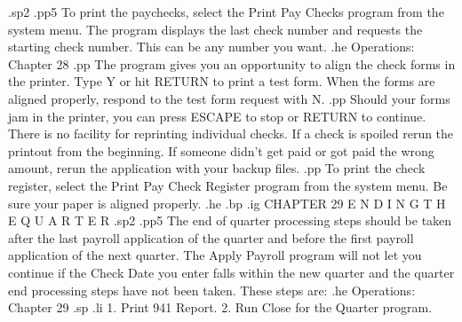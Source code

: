 .sp2
.pp5
To print the paychecks, select the Print Pay Checks program from the
system menu. The program displays the last check number and
requests the starting check number.  This can be any number you want.
.he Operations: Chapter 28
.pp
The program gives you an opportunity to align the check forms in
the printer.  Type Y or hit RETURN to print a test form.  When the
forms are aligned properly, respond to the test form request with N.
.pp
Should your forms jam in the printer, you can press ESCAPE to stop
or RETURN to continue.	There is no facility for reprinting individual
checks.  If a check is spoiled rerun the printout from the
beginning.  If someone didn't get paid or got paid the wrong amount,
rerun the application with your backup files.
.pp
To print the check register, select the Print Pay Check Register program
from the system menu.	Be sure your paper is aligned properly.
.he
.bp
.ig
CHAPTER 29
E N D I N G    T H E	Q U A R T E R
.sp2
.pp5
The end of quarter processing steps should be taken after
the last payroll application of the quarter and before the first
payroll application of the next quarter.  The Apply Payroll program
will not let you continue if the Check Date you enter falls within
the new quarter and the quarter end processing steps have not been
taken.	These steps are:
.he Operations: Chapter 29
.sp
.li
		1. Print 941 Report.
		2. Run Close for the Quarter program.

